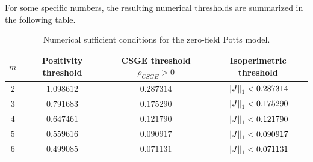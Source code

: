 \begin{remark}
    For some specific numbers, the resulting numerical thresholds are summarized in the following table.
    \begin{table}[htbp]
    \centering
    \begin{tabular}{c|ccc}
        \hline
        $m$ & Positivity threshold & CSGE threshold $\rho_{CSGE}>0$
            & Isoperimetric threshold \\
        \hline
        $2$ & $1.098612$ & $0.287314$ & $\left\lVert J \right\rVert_1<0.287314$ \\
        $3$ & $0.791683$ & $0.175290$ & $\left\lVert J \right\rVert_1<0.175290$ \\
        $4$ & $0.647461$ & $0.121790$ & $\left\lVert J \right\rVert_1<0.121790$ \\
        $5$ & $0.559616$ & $0.090917$ & $\left\lVert J \right\rVert_1<0.090917$ \\
        $6$ & $0.499085$ & $0.071131$ & $\left\lVert J \right\rVert_1<0.071131$ \\
        \hline
    \end{tabular}
    \caption{Numerical sufficient conditions for the zero-field Potts model.}
    \label{tab:potts-thresholds}
\end{table}
\end{remark}